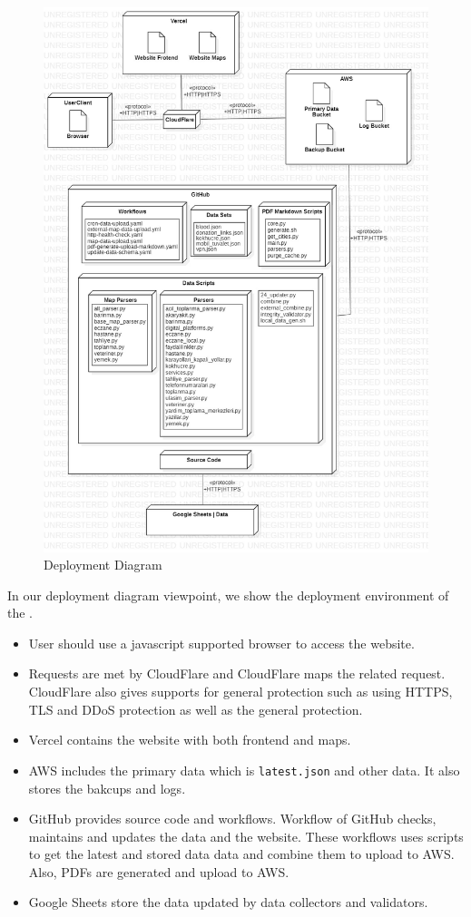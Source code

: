 \begin{figure}[H]
  \centering
  \includegraphics[width=\linewidth]{img/deployment-diagram.jpg}
  \caption{Deployment Diagram}
\end{figure}

In our deployment diagram viewpoint, we show the deployment environment of the \afetbilgi.
\begin{itemize}
  \item User should use a javascript supported browser to access the website.
  \item Requests are met by CloudFlare and CloudFlare maps the related request. CloudFlare also gives supports for general protection such as using HTTPS, TLS and DDoS protection as well as the general protection.
  \item Vercel contains the website with both frontend and maps.
  \item AWS includes the primary data which is \texttt{latest.json} and other data. It also stores the bakcups and logs.
  \item GitHub provides source code and workflows. Workflow of GitHub checks, maintains and updates the data and the website. These workflows uses scripts to get the latest and stored data data and combine them to upload to AWS. Also, PDFs are generated and upload to AWS.
  \item Google Sheets store the data updated by data collectors and validators.
\end{itemize}

